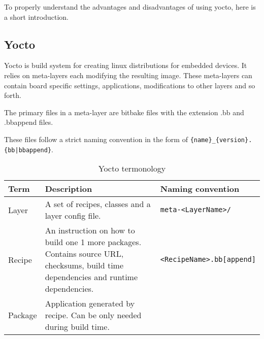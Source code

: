 \documentclass[../../main.tex]{subfiles}
\begin{document}
To properly understand the advantages and disadvantages of using yocto, here is a short introduction.

\subsection{Yocto}%
\label{sub:yocto}

Yocto is build system for creating linux distributions for embedded devices. It relies on meta-layers
each modifying the resulting image. These meta-layers can contain board specific settings,
applications, modifications to other layers and so forth.

The primary files in a meta-layer are bitbake files with the extension .bb and .bbappend files.

These files follow a strict naming convention in the form of
\texttt{\{name\}\_\{version\}.\{bb|bbappend\}}.\\

\begin{table}[h]
	\centering
	\caption{Yocto termonology}
	\label{tab:label}
	\begin{tabular}{lp{}p{5cm}}
		\textbf{Term} & \textbf{Description} & \textbf{Naming convention}\\
		\hline
		Layer & A set of recipes, classes and a layer config file. &
		\texttt{meta-<LayerName>/} \\
		Recipe & An instruction on how to build one 1 more packages.
		Contains source URL, checksums, build time dependencies and runtime dependencies.
					 & \texttt{<RecipeName>.bb[append]}\\
		Package & Application generated by recipe. Can be only needed during build time. &\\
	\end{tabular}
\end{table}



%
%
%
%
%
\end{document}
